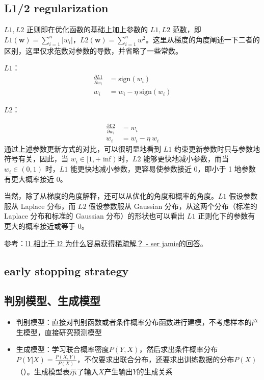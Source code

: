 
\subsection{L1/2 regularization}
$L1, L2$ 正则即在优化函数的基础上加上参数的 $L1, L2$ 范数，即 $L1(\boldsymbol{w}) = \sum_{i=1}^{n} |w_i|$，$L2(\boldsymbol{w}) = \sum_{i=1}^{n} w^2$。这里从梯度的角度阐述一下二者的区别，这里仅求范数对参数的导数，并省略了一些常数。

$L1$：
$$
\begin{aligned}
	\frac{\partial L1}{\partial w_i} &=  \text{sign}(w_i) \\
	w_i &= w_i - \eta\ \text{sign}(w_i)	
\end{aligned}
$$

$L2$：

$$
\begin{aligned}
	\frac{\partial L2}{\partial w_i} &=  w_i \\
	w_i &= w_i - \eta\ w_i
\end{aligned}
$$
通过上述参数更新方式的对比，可以很明显地看到 $L1$ 约束更新参数时只与参数地符号有关，因此，当 $w_i \in [1, +\inf)$ 时，$L2$ 能够更快地减小参数，而当 $w_i \in (0, 1)$ 时，$L1$ 能更快地减小参数，更容易使参数接近 0，即小于 1 地参数有更大概率接近 0。

当然，除了从梯度的角度解释，还可以从优化的角度和概率的角度。$L1$ 假设参数服从 Laplace 分布，而 $L2$ 假设参数服从 Gaussian 分布，从这两个分布（标准的 Laplace 分布和标准的 Gaussian 分布）的形状也可以看出 $L1$ 正则化下的参数有更大的概率接近或等于 0。

参考：\href{https://www.zhihu.com/question/37096933/answer/475278057}{l1 相比于 l2 为什么容易获得稀疏解？ - ser jamie的回答}。

\subsection{early stopping strategy}

\subsection{判别模型、生成模型}
\begin{itemize}
	\item 判别模型：直接对判别函数或者条件概率分布函数进行建模，不考虑样本的产生模型，直接研究预测模型
	\item 生成模型：学习联合概率密度$P(Y, X)$，然后求出条件概率分布$P(Y|X) = \frac{P(X, Y)}{P(X)}$，不仅要求出联合分布，还要求出训练数据的分布$P(X)$（{\color{red}{不一定要计算$p(X)$，因为对于同一个样本，计算它属于不同分类时，其$p(X)$是一样的，对判别没有帮助}}）。生成模型表示了输入$X$产生输出$Y$的生成关系
\end{itemize}

